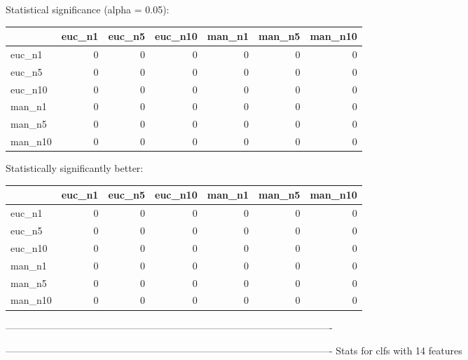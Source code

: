 Statistical significance (alpha = 0.05):
 \begin{tabular}{lrrrrrr}
\hline
         &   euc\_n1 &   euc\_n5 &   euc\_n10 &   man\_n1 &   man\_n5 &   man\_n10 \\
\hline
 euc\_n1  &        0 &        0 &         0 &        0 &        0 &         0 \\
 euc\_n5  &        0 &        0 &         0 &        0 &        0 &         0 \\
 euc\_n10 &        0 &        0 &         0 &        0 &        0 &         0 \\
 man\_n1  &        0 &        0 &         0 &        0 &        0 &         0 \\
 man\_n5  &        0 &        0 &         0 &        0 &        0 &         0 \\
 man\_n10 &        0 &        0 &         0 &        0 &        0 &         0 \\
\hline
\end{tabular} 

Statistically significantly better:
 \begin{tabular}{lrrrrrr}
\hline
         &   euc\_n1 &   euc\_n5 &   euc\_n10 &   man\_n1 &   man\_n5 &   man\_n10 \\
\hline
 euc\_n1  &        0 &        0 &         0 &        0 &        0 &         0 \\
 euc\_n5  &        0 &        0 &         0 &        0 &        0 &         0 \\
 euc\_n10 &        0 &        0 &         0 &        0 &        0 &         0 \\
 man\_n1  &        0 &        0 &         0 &        0 &        0 &         0 \\
 man\_n5  &        0 &        0 &         0 &        0 &        0 &         0 \\
 man\_n10 &        0 &        0 &         0 &        0 &        0 &         0 \\
\hline
\end{tabular} 

----------------------------------------------------------------------------------------------------



----------------------------------------------------------------------------------------------------
Stats for clfs with 14 features


